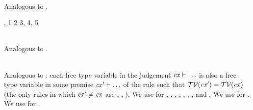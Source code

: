 \begin{bycase}
\Case{\Revar}
\begin{derivation}
\step{\vdecO\in\cx}{\premof{\Revar}}
\step{\cxwf{\cx}}{\premof{\Revar}}
\steP
{\cxtvarO
 \cup\ftvar{\typ}
 \linK{\supseteq}
 \ftvar{\typ}}
\step{\cxwfO}{\premof{\Revar}}
\end{derivation}

\Case{\Reop}\\
Analogous to \Rtedef.

\Case{\Reabs}
\begin{derivation}
     {\indhyp, 1}
     {2}
\steP{\ftvar{\absO}=\ftvar{\typ}\cup\ftvar{\expr}}
     {3, 4, 5}
\end{derivation}

\Case{\Rthax}\\
Analogous to \Rtedef.

\Case{\restrules}\\
Analogous to \Rtinst: each free type variable in the judgement $\mathit{cx}\vdash\ldots$
is also a free type variable in some premise $\mathit{cx}'\vdash\ldots$ of the rule such
that $\mathcal{TV}(\mathit{cx}')=\mathcal{TV}(\mathit{cx})$ (the only rules in which $\mathit{cx}'\neq\mathit{cx}$ are
\Reif, \Rthifsbs, \Rthif). We use  for
\Rstrefl, \Rstarr, \Rstrec,
\Redesc, \Rthbool, \Rthext, \Rthrec,
and \Rthprojsub.
We use  for \Reabsalpha. We use
 for \Rthabs.

\end{bycase}



